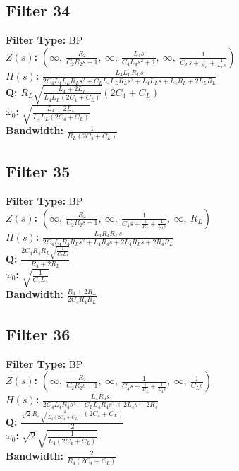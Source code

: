 \documentclass{article}
\begin{document}
\subsection*{Filter 34}
\textbf{Filter Type:} BP \\ 
\textbf{$Z(s)$:} $\left( \infty, \  \frac{R_{2}}{C_{2} R_{2} s + 1}, \  \infty, \  \frac{L_{4} s}{C_{4} L_{4} s^{2} + 1}, \  \infty, \  \frac{1}{C_{L} s + \frac{1}{R_{L}} + \frac{1}{L_{L} s}}\right)$ \\ 
\textbf{$H(s)$:} $\frac{L_{4} L_{L} R_{L} s}{2 C_{4} L_{4} L_{L} R_{L} s^{2} + C_{L} L_{4} L_{L} R_{L} s^{2} + L_{4} L_{L} s + L_{4} R_{L} + 2 L_{L} R_{L}}$ \\ 
\textbf{Q:} $R_{L} \sqrt{\frac{L_{4} + 2 L_{L}}{L_{4} L_{L} \left(2 C_{4} + C_{L}\right)}} \left(2 C_{4} + C_{L}\right)$ \\ 
\textbf{$\omega_0$:} $\sqrt{\frac{L_{4} + 2 L_{L}}{L_{4} L_{L} \left(2 C_{4} + C_{L}\right)}}$ \\ 
\textbf{Bandwidth:} $\frac{1}{R_{L} \left(2 C_{4} + C_{L}\right)}$ \\ 
\subsection*{Filter 35}
\textbf{Filter Type:} BP \\ 
\textbf{$Z(s)$:} $\left( \infty, \  \frac{R_{2}}{C_{2} R_{2} s + 1}, \  \infty, \  \frac{1}{C_{4} s + \frac{1}{R_{4}} + \frac{1}{L_{4} s}}, \  \infty, \  R_{L}\right)$ \\ 
\textbf{$H(s)$:} $\frac{L_{4} R_{4} R_{L} s}{2 C_{4} L_{4} R_{4} R_{L} s^{2} + L_{4} R_{4} s + 2 L_{4} R_{L} s + 2 R_{4} R_{L}}$ \\ 
\textbf{Q:} $\frac{2 C_{4} R_{4} R_{L} \sqrt{\frac{1}{C_{4} L_{4}}}}{R_{4} + 2 R_{L}}$ \\ 
\textbf{$\omega_0$:} $\sqrt{\frac{1}{C_{4} L_{4}}}$ \\ 
\textbf{Bandwidth:} $\frac{R_{4} + 2 R_{L}}{2 C_{4} R_{4} R_{L}}$ \\ 
\subsection*{Filter 36}
\textbf{Filter Type:} BP \\ 
\textbf{$Z(s)$:} $\left( \infty, \  \frac{R_{2}}{C_{2} R_{2} s + 1}, \  \infty, \  \frac{1}{C_{4} s + \frac{1}{R_{4}} + \frac{1}{L_{4} s}}, \  \infty, \  \frac{1}{C_{L} s}\right)$ \\ 
\textbf{$H(s)$:} $\frac{L_{4} R_{4} s}{2 C_{4} L_{4} R_{4} s^{2} + C_{L} L_{4} R_{4} s^{2} + 2 L_{4} s + 2 R_{4}}$ \\ 
\textbf{Q:} $\frac{\sqrt{2} R_{4} \sqrt{\frac{1}{L_{4} \left(2 C_{4} + C_{L}\right)}} \left(2 C_{4} + C_{L}\right)}{2}$ \\ 
\textbf{$\omega_0$:} $\sqrt{2} \sqrt{\frac{1}{L_{4} \left(2 C_{4} + C_{L}\right)}}$ \\ 
\textbf{Bandwidth:} $\frac{2}{R_{4} \left(2 C_{4} + C_{L}\right)}$ \\ 
\end{document}
